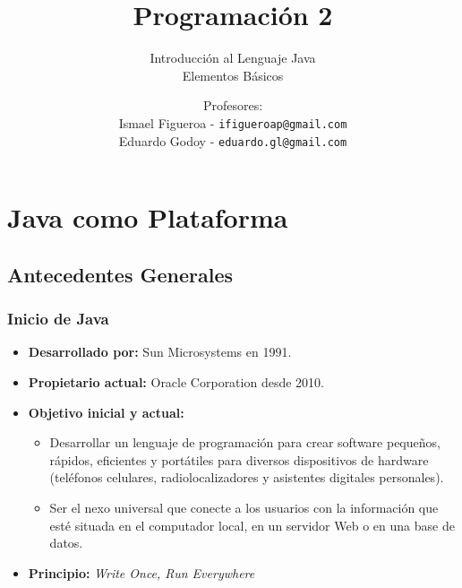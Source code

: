 \documentclass{beamer}
\title[\textbf{Programación 2}]{\textbf{Programación 2}}
\subtitle{Introducción al Lenguaje Java\\Elementos Básicos}
\author[IF-EG]
{
  Profesores:\\
  Ismael Figueroa -  \texttt{\small ifigueroap@gmail.com}\\
  \vspace{0.5mm}
  Eduardo Godoy - \texttt{\small eduardo.gl@gmail.com}
}
\institute[Universidad de Valparaíso]
\date{}
\begin{document}
\begin{frame}
  \titlepage
\end{frame}


\section{Java como Plataforma}

\subsection{Antecedentes Generales}

\begin{frame}
  \frametitle{Inicio de Java}

    \begin{itemize}
    \item \textbf{Desarrollado por:} Sun Microsystems en 1991.
    \item \textbf{Propietario actual:} Oracle Corporation desde 2010.
    \item \textbf{Objetivo inicial y actual:}
      
      \begin{itemize}
      \item Desarrollar un lenguaje de programación para crear
        software peque\~nos, rápidos, eficientes y portátiles para
        diversos dispositivos de hardware (teléfonos celulares,
        radiolocalizadores y asistentes digitales personales).
        
      \item Ser el nexo universal que conecte a los usuarios con la
        información que esté situada en el computador local, en un
        servidor Web o en una base de datos.
      \end{itemize}
      
    \item \textbf{Principio:} \emph{Write Once, Run Everywhere}
      
    \end{itemize}    

\end{frame}
\end{document}
